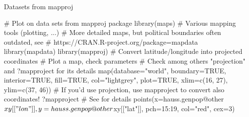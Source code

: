 \documentclass[compress, xelatex, 11pt, xcolor=svgnames, aspectratio=169,
	hyperref={
		bookmarks=true,
		unicode=true,
		colorlinks=true,
		pdftitle={Molecular data in R},
		plainpages=false,
		pdfauthor={Vojtech Zeisek},
		pdfsubject={Course about phylogeny and evolution in R},
		pdfcreator={XeLaTeX},
		pdfkeywords={R, evolution, phylogeny, molecular data},
		linkcolor=Crimson, %
		anchorcolor=Magenta, %
		citecolor=Magenta, %
		filecolor=Magenta, %
		menucolor=Magenta, %
		urlcolor=DodgerBlue, %
		},
	url={hyphens, lowtilde} %
	]{beamer}
\begin{document}
\begin{frame}[fragile]{Datasets from mapproj}
	\begin{spluscode}
    # Plot on data sets from mapproj package
    library(maps) # Various mapping tools (plotting, ...)
    # More detailed maps, but political boundaries often outdated, see
    # https://CRAN.R-project.org/package=mapdata
    library(mapdata)
    library(mapproj)
    # Convert latitude/longitude into projected coordinates
    # Plot a map, check parameters
    # Check among others "projection" and ?mapproject for its details
    map(database="world", boundary=TRUE, interior=TRUE, fill=TRUE,
      col="lightgrey", plot=TRUE, xlim=c(16, 27), ylim=c(37, 46))
    # If you'd use projection, use mapproject to convert also coordinates!
    ?mapproject # See for details
    points(x=hauss.genpop@other$xy[["lon"]], y=hauss.genpop@other$xy[["lat"]],
      pch=15:19, col="red", cex=3)
	\end{spluscode}
\end{frame}
\end{document}
